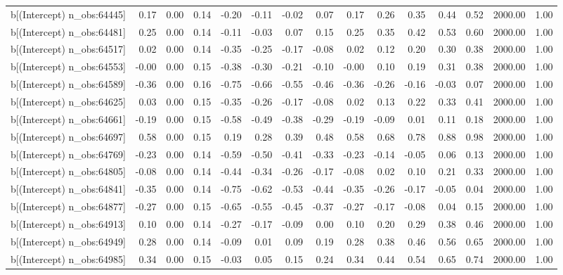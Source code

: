 \begin{table}[ht]
\begin{tabular}{rrrrrrrrrrrrrrr}
  b[(Intercept) n\_obs:64445] & 0.17 & 0.00 & 0.14 & -0.20 & -0.11 & -0.02 & 0.07 & 0.17 & 0.26 & 0.35 & 0.44 & 0.52 & 2000.00 & 1.00 \\ 
  b[(Intercept) n\_obs:64481] & 0.25 & 0.00 & 0.14 & -0.11 & -0.03 & 0.07 & 0.15 & 0.25 & 0.35 & 0.42 & 0.53 & 0.60 & 2000.00 & 1.00 \\ 
  b[(Intercept) n\_obs:64517] & 0.02 & 0.00 & 0.14 & -0.35 & -0.25 & -0.17 & -0.08 & 0.02 & 0.12 & 0.20 & 0.30 & 0.38 & 2000.00 & 1.00 \\ 
  b[(Intercept) n\_obs:64553] & -0.00 & 0.00 & 0.15 & -0.38 & -0.30 & -0.21 & -0.10 & -0.00 & 0.10 & 0.19 & 0.31 & 0.38 & 2000.00 & 1.00 \\ 
  b[(Intercept) n\_obs:64589] & -0.36 & 0.00 & 0.16 & -0.75 & -0.66 & -0.55 & -0.46 & -0.36 & -0.26 & -0.16 & -0.03 & 0.07 & 2000.00 & 1.00 \\ 
  b[(Intercept) n\_obs:64625] & 0.03 & 0.00 & 0.15 & -0.35 & -0.26 & -0.17 & -0.08 & 0.02 & 0.13 & 0.22 & 0.33 & 0.41 & 2000.00 & 1.00 \\ 
  b[(Intercept) n\_obs:64661] & -0.19 & 0.00 & 0.15 & -0.58 & -0.49 & -0.38 & -0.29 & -0.19 & -0.09 & 0.01 & 0.11 & 0.18 & 2000.00 & 1.00 \\ 
  b[(Intercept) n\_obs:64697] & 0.58 & 0.00 & 0.15 & 0.19 & 0.28 & 0.39 & 0.48 & 0.58 & 0.68 & 0.78 & 0.88 & 0.98 & 2000.00 & 1.00 \\ 
  b[(Intercept) n\_obs:64769] & -0.23 & 0.00 & 0.14 & -0.59 & -0.50 & -0.41 & -0.33 & -0.23 & -0.14 & -0.05 & 0.06 & 0.13 & 2000.00 & 1.00 \\ 
  b[(Intercept) n\_obs:64805] & -0.08 & 0.00 & 0.14 & -0.44 & -0.34 & -0.26 & -0.17 & -0.08 & 0.02 & 0.10 & 0.21 & 0.33 & 2000.00 & 1.00 \\ 
  b[(Intercept) n\_obs:64841] & -0.35 & 0.00 & 0.14 & -0.75 & -0.62 & -0.53 & -0.44 & -0.35 & -0.26 & -0.17 & -0.05 & 0.04 & 2000.00 & 1.00 \\ 
  b[(Intercept) n\_obs:64877] & -0.27 & 0.00 & 0.15 & -0.65 & -0.55 & -0.45 & -0.37 & -0.27 & -0.17 & -0.08 & 0.04 & 0.15 & 2000.00 & 1.00 \\ 
  b[(Intercept) n\_obs:64913] & 0.10 & 0.00 & 0.14 & -0.27 & -0.17 & -0.09 & 0.00 & 0.10 & 0.20 & 0.29 & 0.38 & 0.46 & 2000.00 & 1.00 \\ 
  b[(Intercept) n\_obs:64949] & 0.28 & 0.00 & 0.14 & -0.09 & 0.01 & 0.09 & 0.19 & 0.28 & 0.38 & 0.46 & 0.56 & 0.65 & 2000.00 & 1.00 \\ 
  b[(Intercept) n\_obs:64985] & 0.34 & 0.00 & 0.15 & -0.03 & 0.05 & 0.15 & 0.24 & 0.34 & 0.44 & 0.54 & 0.65 & 0.74 & 2000.00 & 1.00 \\ 

\end{tabular}
\end{table}
